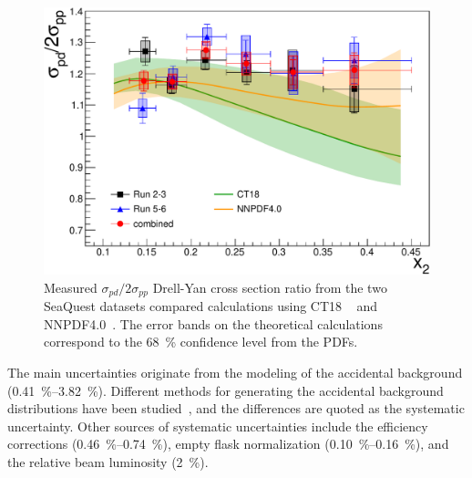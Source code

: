 \documentclass[reprint,aps,unsortedaddress,superscriptaddress,prl,floatfix,showpacs,linenumbers,final]{revtex4-2}
\begin{document}
\begin{figure}[htbp!]
	\centering
	\includegraphics[width=\linewidth]{data_full_xT_syst.pdf}
	\caption{Measured $\sigma_{pd}/2\sigma_{pp}$ Drell-Yan cross section ratio from the two SeaQuest datasets compared calculations using
		CT18 ~\cite{hou2021} and NNPDF4.0~\cite{ball2022a}.
		The error bands on the theoretical calculations correspond to the \SI{68}{\percent} confidence level from the PDFs.}
	\label{fig:xT_csr}
\end{figure}

The main uncertainties originate from the modeling of the accidental background (\qtyrange{0.41}{3.82}{\percent}).
Different methods for generating the accidental background distributions have been studied~\cite{pate2023},
and the differences are quoted as the systematic uncertainty.
Other sources of systematic uncertainties include the efficiency corrections (\qtyrange{0.46}{0.74}{\percent}),
empty flask normalization (\qtyrange{0.10}{0.16}{\percent}), and the relative beam luminosity (\SI{2}{\percent}).

\end{document}
